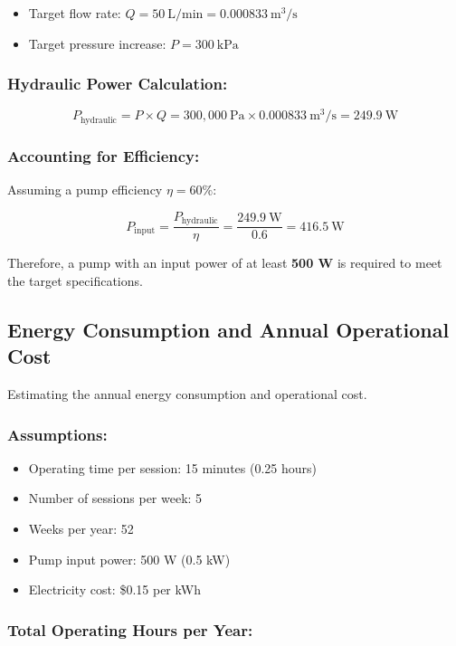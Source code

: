 \documentclass[12pt]{report}
\begin{document}
\begin{itemize}
\item Target flow rate: \( Q = 50\ \text{L/min} = 0.000833\ \text{m}^3/\text{s} \)
\item Target pressure increase: \( P = 300\ \text{kPa} \)
\end{itemize}

\subsubsection{Hydraulic Power Calculation:}

\[
P_{\text{hydraulic}} = P \times Q = 300,000\ \text{Pa} \times 0.000833\ \text{m}^3/\text{s} = 249.9\ \text{W}
\]

\subsubsection{Accounting for Efficiency:}

Assuming a pump efficiency \( \eta = 60\% \):

\[
P_{\text{input}} = \frac{P_{\text{hydraulic}}}{\eta} = \frac{249.9\ \text{W}}{0.6} = 416.5\ \text{W}
\]

Therefore, a pump with an input power of at least \textbf{500 W} is required to meet the target specifications.

\subsection{Energy Consumption and Annual Operational Cost}

Estimating the annual energy consumption and operational cost.

\subsubsection{Assumptions:}

\begin{itemize}
\item Operating time per session: 15 minutes (0.25 hours)
\item  Number of sessions per week: 5
\item Weeks per year: 52
\item Pump input power: 500 W (0.5 kW)
\item Electricity cost: \$0.15 per kWh
\end{itemize}

\subsubsection{Total Operating Hours per Year:}
\end{document}
